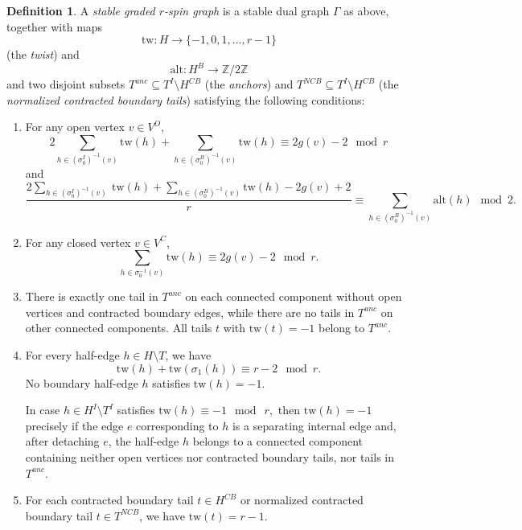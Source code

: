 \documentclass[11pt,a4paper]{article}
\theoremstyle{definition}
\newtheorem{definition}[dummy]{Definition}
\theoremstyle{remark}
\newcommand{\alt}{{\text{alt}}}
\newcommand{\twE}{\text{tw}}
\numberwithin{equation}{section}
\begin{document}
\begin{definition}
\label{def rspin dual graph}
A \textit{stable graded $r$-spin graph} is a stable dual graph $\Gamma$ as above, together with maps
\[\twE: H \to \{-1, 0, 1, \ldots, r-1\}\]
(the \textit{twist}) and
\[\alt: H^B \to {\mathbb{Z}}/2{\mathbb{Z}}\]
and two disjoint subsets $T^{anc}\subseteq T^I\setminus H^{CB}$ (the \textit{anchors}) and $T^{NCB} \subseteq T^I\setminus H^{CB}$ (the \textit{normalized contracted boundary tails})
satisfying the following conditions:
\begin{enumerate}[label=(\emph{\roman*})]







\item
 \label{item} For any open vertex $v \in V^O$,
\[2\sum_{h \in (\sigma_0^I)^{-1}(v)} \twE(h) + \sum_{h \in (\sigma_0^B)^{-1}(v)} \twE(h) \equiv 2g(v)-2 \mod r\]
and
\begin{equation}\label{eq legal mod 2}
   \frac{2\sum_{h \in  (\sigma_0^I)^{-1}(v)}\ \twE(h) + \sum_{h \in (\sigma_0^B)^{-1}(v)} \twE(h)-2g(v) + 2}{r} \equiv \sum_{h \in (\sigma_0^B)^{-1}(v)} \alt(h) \mod 2.
\end{equation}

\item
For any closed vertex $v \in V^C$,
\[\sum_{h \in \sigma_0^{-1}(v)} \twE(h) \equiv 2g(v)-2 \mod r.\]

\item \label{item:condition on anchor}
    There is exactly one tail in $T^{anc}$ on each connected component without open vertices and contracted boundary edges, while there are no tails in $T^{anc}$ on other connected components. All tails $t$ with $\twE(t) =-1$ belong to $T^{anc}$.


\item
\label{cond2} For every half-edge $h \in H \setminus T$, we have
\[\twE(h) + \twE(\sigma_1(h)) \equiv r -2 \mod r.\]
No boundary half-edge $h$ satisfies $\twE(h)=-1$. 

In case $h \in H^I \setminus T^I$ satisfies $\twE(h) \equiv -1\mod~r,$ then $\twE(h)=-1$ precisely if the edge $e$ corresponding to $h$ is a separating internal edge and, after detaching $e$, the half-edge $h$ belongs to a connected component containing neither open vertices nor contracted boundary tails, nor tails in $T^{anc}$.

\item
\label{cond1} For each contracted boundary tail $t \in H^{CB}$ or normalized contracted boundary tail $t \in T^{NCB}$, we have $\twE(t) =r-1$.


\end{enumerate}
\end{definition}
\end{document}
